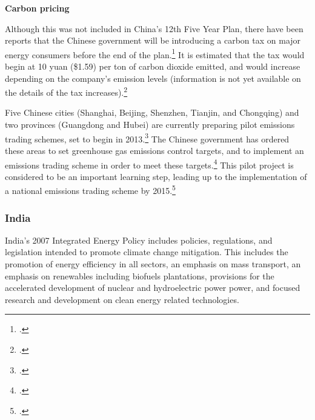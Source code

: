 \textbf{Carbon pricing}



Although this was not included in China's 12th Five Year Plan, there have been reports that the Chinese government will be introducing a carbon tax on major energy consumers before the end of the plan.\footcite[][]{ChinaCarbonTax}
It is estimated that the tax would begin at 10 yuan (\$1.59) per ton of carbon dioxide emitted, and would increase depending on the company’s emission levels (information is not yet available on the details of the tax increases).\footcite[][]{ChinaCarbonTax}



Five Chinese cities (Shanghai, Beijing, Shenzhen, Tianjin, and Chongqing) and two provinces (Guangdong and Hubei) are currently preparing pilot emissions trading schemes, set to begin in 2013.\footcite[][]{PilotTrading}
The Chinese government has ordered these areas to set greenhouse gas emissions control targets, and to implement an emissions trading scheme in order to meet these targets.\footcite[][]{PilotTrading}
This pilot project is considered to be an important learning step, leading up to the implementation of a national emissions trading scheme by 2015.\footcite[][]{PilotTrading}



	\subsubsection{India}






India's 2007 Integrated Energy Policy includes policies, regulations, and legislation intended to promote climate change mitigation.
This includes the promotion of energy efficiency in all sectors, an emphasis on mass transport, an emphasis on renewables including biofuels plantations, provisions for the accelerated development of nuclear and hydroelectric power power, and focused research and development on clean energy related technologies.




